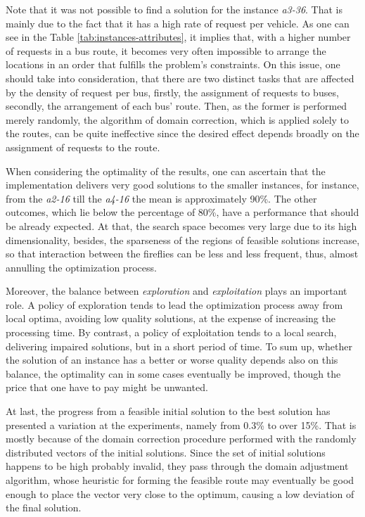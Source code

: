 \documentclass[tuberlin,cic,tc,openright,english,noabntcite,oneside]{iiufrgs}
\begin{document}
Note that it was not possible to find a solution for the instance \emph{a3-36}. That is mainly due to the fact that it has a high rate of request per vehicle. As one can see in the Table \ref{tab:instances-attributes}, it implies that, with a higher number of requests in a bus route, it becomes very often impossible to arrange the locations in an order that fulfills the problem's constraints. On this issue, one should take into consideration, that there are two distinct tasks that are affected by the density of request per bus, firstly, the assignment of requests to buses, secondly, the arrangement of each bus' route. Then, as the former is performed merely randomly, the algorithm of domain correction, which is applied solely to the routes, can be quite ineffective since the desired effect depends broadly on the assignment of requests to the route.

When considering the optimality of the results, one can ascertain that the implementation delivers very good solutions to the smaller instances, for instance, from the \emph{a2-16} till the \emph{a4-16} the mean is approximately 90\%. The other outcomes, which lie below the percentage of 80\%, have a performance that should be already expected. At that, the search space becomes very large due to its high dimensionality, besides, the sparseness of the regions of feasible solutions increase, so that interaction between the fireflies can be less and less frequent, thus, almost annulling the optimization process.

Moreover, the balance between \emph{exploration} and \emph{exploitation} plays an important role. A policy of exploration tends to lead the optimization process away from local optima, avoiding low quality solutions, at the expense of increasing the processing time. By contrast, a policy of exploitation tends to a local search, delivering impaired solutions, but in a short period of time. To sum up, whether the solution of an instance has a better or worse quality depends also on this balance, the optimality can in some cases eventually be improved, though the price that one have to pay might be unwanted.

At last, the progress from a feasible initial solution to the best solution has presented a variation at the experiments, namely from 0.3\% to over 15\%. That is mostly because of the domain correction procedure performed with the randomly distributed vectors of the initial solutions. Since the set of initial solutions happens to be high probably invalid, they pass through the domain adjustment algorithm, whose heuristic for forming the feasible route may eventually be good enough to place the vector very close to the optimum, causing a low deviation of the final solution.
\end{document}
